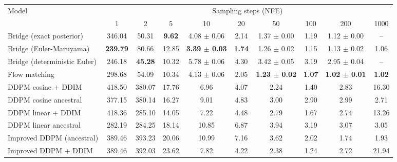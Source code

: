 \begin{tabular}{lccccccccc}
\toprule
Model & \multicolumn{9}{c}{Sampling steps (NFE)} \\
\cmidrule(lr){2-10}
 & 1 & 2 & 5 & 10 & 20 & 50 & 100 & 200 & 1000 \\
\midrule
Bridge (exact posterior) & 346.04 & 50.31 & \textbf{9.62} & 4.08 $\pm$ 0.06 & 2.14 & 1.37 $\pm$ 0.00 & 1.19 & 1.12 $\pm$ 0.00 & -- \\
Bridge (Euler-Maruyama) & \textbf{239.79} & 80.66 & 12.85 & \textbf{3.39 $\pm$ 0.03} & \textbf{1.74} & 1.26 $\pm$ 0.02 & 1.15 & 1.13 $\pm$ 0.02 & 1.06 \\
Bridge (deterministic Euler) & 246.18 & \textbf{45.28} & 10.32 & 5.78 $\pm$ 0.06 & 4.30 & 3.42 $\pm$ 0.05 & 3.19 & 2.95 $\pm$ 0.04 & -- \\
Flow matching & 298.68 & 54.09 & 10.34 & 4.13 $\pm$ 0.06 & 2.05 & \textbf{1.23 $\pm$ 0.02} & \textbf{1.07} & \textbf{1.02 $\pm$ 0.01} & \textbf{1.02} \\
DDPM cosine + DDIM & 418.50 & 380.07 & 17.76 & 6.96 & 4.07 & 2.24 & 1.40 & 2.83 & 16.30 \\
DDPM cosine ancestral & 377.15 & 380.14 & 16.27 & 9.01 & 4.83 & 3.00 & 2.90 & 2.99 & 2.71 \\
DDPM linear + DDIM & 418.36 & 285.10 & 14.05 & 7.22 & 4.48 & 2.79 & 1.67 & 2.74 & 13.26 \\
DDPM linear ancestral & 282.19 & 284.25 & 18.14 & 10.85 & 6.87 & 3.94 & 3.19 & 3.07 & 3.05 \\
Improved DDPM (ancestral) & 389.46 & 393.23 & 20.06 & 10.99 & 7.16 & 3.62 & 2.02 & 1.74 & 1.93 \\
Improved DDPM + DDIM & 389.46 & 392.03 & 23.62 & 7.82 & 4.22 & 2.38 & 1.24 & 2.72 & 21.94 \\
\bottomrule
\end{tabular}
